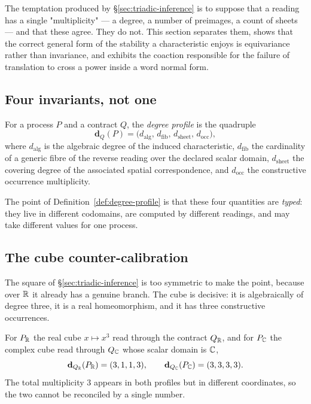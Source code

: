\label{sec:multiplicity-body}

The temptation produced by \S\ref{sec:triadic-inference} is to suppose that a reading
has a single "multiplicity" --- a degree, a number of preimages, a count of sheets ---
and that these agree.  They do not.  This section separates them, shows that the
correct general form of the stability a characteristic enjoys is equivariance rather
than invariance, and exhibits the coaction responsible for the failure of translation
to cross a power inside a word normal form.

\subsection{Four invariants, not one}

\begin{definition}\label{def:degree-profile}
For a process $P$ and a contract $Q$, the \emph{degree profile} is the quadruple
\[
  \mathbf d_Q(P)=\bigl(d_{\mathrm{alg}},\,d_{\mathrm{fib}},\,d_{\mathrm{sheet}},\,
  d_{\mathrm{occ}}\bigr),
\]
where $d_{\mathrm{alg}}$ is the algebraic degree of the induced characteristic,
$d_{\mathrm{fib}}$ the cardinality of a generic fibre of the reverse reading over the
declared scalar domain, $d_{\mathrm{sheet}}$ the covering degree of the associated
spatial correspondence, and $d_{\mathrm{occ}}$ the constructive occurrence
multiplicity.
\end{definition}

The point of Definition~\ref{def:degree-profile} is that these four quantities are
\emph{typed}: they live in different codomains, are computed by different readings, and
may take different values for one process.

\subsection{The cube counter-calibration}

The square of \S\ref{sec:triadic-inference} is too symmetric to make the point, because
over $\mathbb{R}$ it already has a genuine branch.  The cube is decisive: it is algebraically
of degree three, it is a real homeomorphism, and it has three constructive occurrences.

\begin{calibration}\label{cal:cube-degrees}
For $P_{\mathbb{R}}$ the real cube $x\mapsto x^{3}$ read through the contract $Q_{\mathbb{R}}$, and for
$P_{\mathbb{C}}$ the complex cube read through $Q_{\mathbb{C}}$ whose scalar domain is $\mathbb{C}$,
\[
  \mathbf d_{Q_{\mathbb{R}}}(P_{\mathbb{R}})=(3,1,1,3),\qquad
  \mathbf d_{Q_{\mathbb{C}}}(P_{\mathbb{C}})=(3,3,3,3).
\]
The total multiplicity $3$ appears in both profiles but in different coordinates, so
the two cannot be reconciled by a single number.
\end{calibration}

